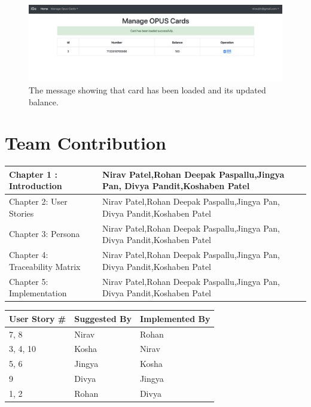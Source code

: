 \documentclass[11pt, english]{report}
\begin{document}
\begin{figure}[H]
  \includegraphics[width=1\textwidth]{images/opus_card_load_successful.png}
  \centering
  \caption{The message showing that card has been loaded and its updated balance.}
\end{figure}



\newpage
\chapter{Team Contribution}

\begin{center}
\begin{tabular}{ | m{20em} | m{8cm}| } 
\hline
Chapter 1 : Introduction & Nirav Patel,Rohan Deepak Paspallu,Jingya Pan,
Divya Pandit,Koshaben Patel\\ 
\hline
Chapter 2: User Stories & Nirav Patel,Rohan Deepak Paspallu,Jingya Pan,
Divya Pandit,Koshaben Patel\\ 
\hline
Chapter 3: Persona & Nirav Patel,Rohan Deepak Paspallu,Jingya Pan,
Divya Pandit,Koshaben Patel\\ 
\hline
Chapter 4: Traceability Matrix & Nirav Patel,Rohan Deepak Paspallu,Jingya Pan,
Divya Pandit,Koshaben Patel\\ 
\hline
Chapter 5: Implementation & Nirav Patel,Rohan Deepak Paspallu,Jingya Pan,
Divya Pandit,Koshaben Patel\\ 
\hline
\end{tabular}

\vspace*{0.5in}
\begin{tabular}{ | m{5em} | m{5cm}| m{5cm}| } 
\hline
User Story # & Suggested By & Implemented By \\
\hline
7, 8 & Nirav & Rohan \\
\hline
3, 4, 10 & Kosha & Nirav \\
\hline
5, 6 & Jingya & Kosha \\
\hline
9 & Divya & Jingya \\
\hline
1, 2 & Rohan & Divya \\
\hline
\end{tabular}

\end{center}


\newpage
\printbibliography
\newpage
\printglossary
\end{document}
